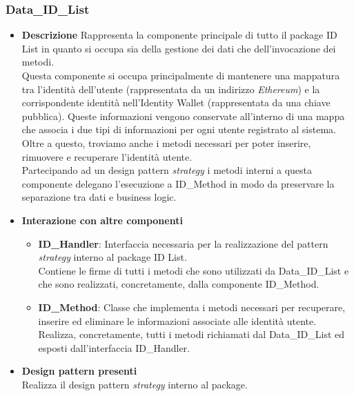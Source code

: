 \subsubsection{Data\_ID\_List}
\begin{itemize}
	\item \textbf{Descrizione}
	Rappresenta la componente principale di tutto il package ID List in quanto si occupa sia della gestione dei dati che dell'invocazione dei metodi.\\
	Questa componente si occupa principalmente di mantenere una mappatura tra l'identità dell'utente (rappresentata da un indirizzo \textit{Ethereum}) e la corrispondente identità nell'Identity Wallet (rappresentata da una chiave pubblica). Queste informazioni vengono conservate all'interno di una mappa che associa i due tipi di informazioni per ogni utente registrato al sistema.\\
	Oltre a questo, troviamo anche i metodi necessari per poter inserire, rimuovere e recuperare l'identità utente.\\
	Partecipando ad un design pattern \textit{strategy} i metodi interni a questa componente delegano l'esecuzione a ID\_Method in modo da preservare la separazione tra dati e business logic.
	\item \textbf{Interazione con altre componenti}
	\begin{itemize}
		\item \textbf{ID\_Handler}: Interfaccia necessaria per la realizzazione del pattern \textit{strategy} interno al package ID List.\\
		Contiene le firme di tutti i metodi che sono utilizzati da Data\_ID\_List e che sono realizzati, concretamente, dalla componente ID\_Method.
		\item \textbf{ID\_Method}: Classe che implementa i metodi necessari per recuperare, inserire ed eliminare le informazioni associate alle identità utente.\\
		Realizza, concretamente, tutti i metodi richiamati dal Data\_ID\_List ed esposti dall'interfaccia ID\_Handler.
	\end{itemize}
	\item \textbf{Design pattern presenti}\\
	Realizza il design pattern \textit{strategy} interno al package.
\end{itemize}

